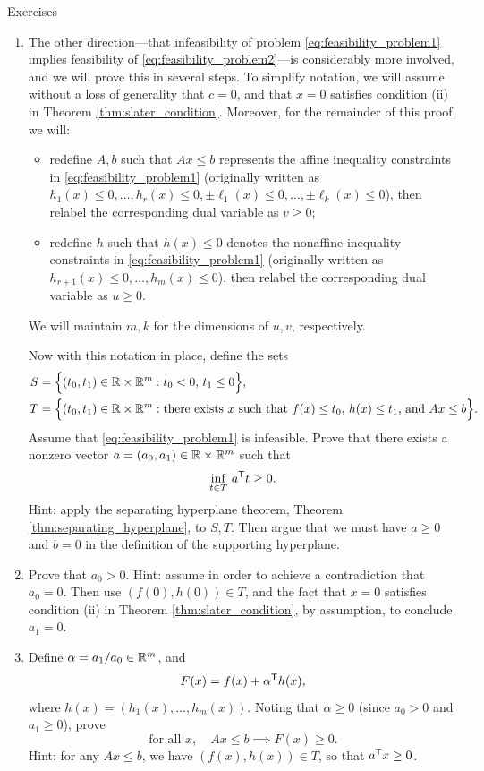 \begin{xcb}{Exercises}
\begin{enumerate}[label=\thechapter.\arabic*]
\begin{enumerate}[label=\alph*.]
\item The other direction---that infeasibility of problem
  \eqref{eq:feasibility_problem1} implies feasibility of
  \eqref{eq:feasibility_problem2}---is considerably more involved, and we will
  prove this in several steps. To simplify notation, we will assume without a
  loss of generality that $c = 0$, and that $x = 0$ satisfies condition (ii) in
  Theorem \ref{thm:slater_condition}. Moreover, for the remainder of this proof,
  we will:    
  \begin{itemize}  
  \item redefine $A,b$ such that $Ax \leq b$ represents the affine inequality
    constraints in \eqref{eq:feasibility_problem1} (originally written as
    $h_1(x) \leq 0, \dots, h_r(x) \leq 0, \pm\ell_1(x) \leq 0, \dots,
    \pm\ell_k(x) \leq 0$), then relabel the corresponding dual variable as $v
    \geq 0$; 
  \item redefine $h$ such that $h(x) \leq 0$ denotes the nonaffine inequality
    constraints in \eqref{eq:feasibility_problem1} (originally written as
    $h_{r+1}(x) \leq 0, \dots, h_m(x) \leq 0$), then relabel the corresponding
    dual variable as $u \geq 0$.
  \end{itemize}
  We will maintain $m,k$ for the dimensions of $u,v$, respectively. 

  \smallskip
  \noindent
  Now with this notation in place, define the sets   
  \begin{align*}
  S &= \Big\{ (t_0, t_1) \in \mathbb{R} \times \mathbb{R}^m : t_0 < 0, \, t_1 \leq 0 \Big\}, \\  
  T &= \Big\{ (t_0, t_1) \in \mathbb{R} \times \mathbb{R}^m : \text{there exists $x$ such that
      $f(x) \leq t_0$, $h(x) \leq t_1$, and $Ax \leq b$} \Big\}. 
  \end{align*}
  Assume that \eqref{eq:feasibility_problem1} is infeasible. Prove that there
  exists a nonzero vector $a = (a_0, a_1) \in \mathbb{R} \times \mathbb{R}^m$ such that 
  \[
  \inf_{t \in T} \, a^{\mathsf{T}} t \geq 0.  
  \]
  Hint: apply the separating hyperplane theorem, Theorem
  \ref{thm:separating_hyperplane}, to $S,T$. Then argue that we must have $a
  \geq 0$ and $b = 0$ in the definition of the supporting hyperplane. 

\item Prove that $a_0 > 0$. Hint: assume in order to achieve a contradiction 
  that $a_0 = 0$. Then use $(f(0), h(0)) \in T$, and the fact that $x = 0$
  satisfies condition (ii) in Theorem \ref{thm:slater_condition}, by assumption,
  to conclude $a_1 = 0$.
\item Define $\alpha = a_1 / a_0 \in \mathbb{R}^m$, and  
  \[
  F(x) = f(x) + \alpha^{\mathsf{T}} h(x),
  \]
  where $h(x) = (h_1(x), \dots, h_m(x))$. Noting that $\alpha \geq 0$ (since
  $a_0 > 0$ and $a_1 \geq 0$), prove
  \[
 \text{for all $x$}, \quad Ax \leq b \implies F(x) \geq 0.
  \]
  Hint: for any $Ax \leq b$, we have $(f(x), h(x)) \in T$, so that $a^{\mathsf{T}} x \geq
  0$.


\end{enumerate}
\end{enumerate}
\end{xcb}
